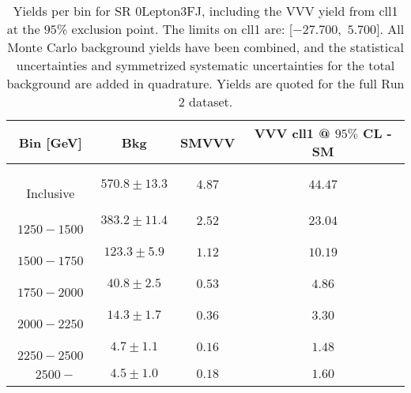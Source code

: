 \begin{table}[!htbp]
    \small
    \center
    \begin{tabular}{c||c|c|c}
    Bin [GeV] & Bkg & SMVVV & \pbox{20cm}{VVV \\ cll1 @ $95\%$ CL - SM \\ }\\
    \hline
    \pbox{20cm}{ ~ \\Inclusive\\ } & $570.8 \pm 13.3$ & $4.87$ & $44.47$\\
    \hline
    \pbox{20cm}{ ~ \\$1250-1500$\\ } & $383.2 \pm 11.4$ & $2.52$ & $23.04$\\
    \hline
    \pbox{20cm}{ ~ \\$1500-1750$\\ } & $123.3 \pm 5.9$ & $1.12$ & $10.19$\\
    \hline
    \pbox{20cm}{ ~ \\$1750-2000$\\ } & $40.8 \pm 2.5$ & $0.53$ & $4.86$\\
    \hline
    \pbox{20cm}{ ~ \\$2000-2250$\\ } & $14.3 \pm 1.7$ & $0.36$ & $3.30$\\
    \hline
    \pbox{20cm}{ ~ \\$2250-2500$\\ } & $4.7 \pm 1.1$ & $0.16$ & $1.48$\\
    \hline
    \pbox{20cm}{ ~ \\$2500-$\\ } & $4.5 \pm 1.0$ & $0.18$ & $1.60$\\
\end{tabular}
    \caption{Yields per bin for SR 0Lepton3FJ, including the VVV yield from cll1 at the $95$\% exclusion point. The limits on cll1 are: [$-27.700$,~$5.700$]. All Monte Carlo background yields have been combined, and the statistical uncertainties and symmetrized systematic uncertainties for the total background are added in quadrature. Yields are quoted for the full Run 2 dataset.}
    \label{tab:0Lepton3FJ$binssignal}
\end{table}
